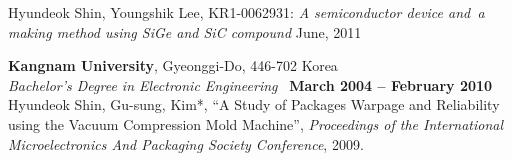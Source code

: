 \documentclass[margin,line]{resume}
\begin{document}
\begin{resume}
    Hyundeok Shin, Youngshik Lee,  KR1-0062931: \textsl{A semiconductor device and\
    a making method using SiGe and SiC compound}  June, 2011
    
    \textbf{Kangnam University}, Gyeonggi-Do, 446-702 Korea \vspace{2mm}\\\vspace{1mm}%
    \textsl{Bachelor's Degree in Electronic Engineering }\
    \hfill \textbf{March 2004 -- February 2010}\vspace{-3mm}\\
    
    Hyundeok Shin, Gu-sung, Kim*,
    ``A Study of Packages Warpage and Reliability using the Vacuum Compression Mold Machine'',
    \textsl{Proceedings of the International Microelectronics And Packaging Society Conference},  2009.

\end{resume}
\end{document}
